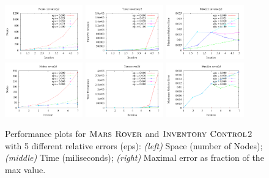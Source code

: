 \begin{figure}[tbp!]
\centering
\includegraphics[width=0.30\textwidth]{Figures/inventory/inventory2Nodes.pdf}
\hspace{3mm}
\includegraphics[width=0.30\textwidth]{Figures/inventory/inventory2Time.pdf}
\hspace{3mm}
\includegraphics[width=0.30\textwidth]{Figures/inventory/inventory2MaxErr.pdf}
\vspace{5mm}
\includegraphics[width=0.30\textwidth]{Figures/rover2D/rover2d-Nodes.pdf}
\hspace{3mm}
\includegraphics[width=0.30\textwidth]{Figures/rover2D/rover2d-Time.pdf}
\hspace{3mm}
\includegraphics[width=0.30\textwidth]{Figures/rover2D/rover2d-MaxErr.pdf}
\vspace{-2mm}
\caption{\footnotesize Performance plots for $\textsc{Mars Rover}$ and $\textsc{Inventory Control}$2 with 5 different relative errors (eps):
{\it (left)}  Space (number of Nodes);
{\it (middle)} Time (miliseconds);
{\it (right)} Maximal error as fraction of the max value.
}
\label{fig:Value}
\vspace{-5mm}
\end{figure}


